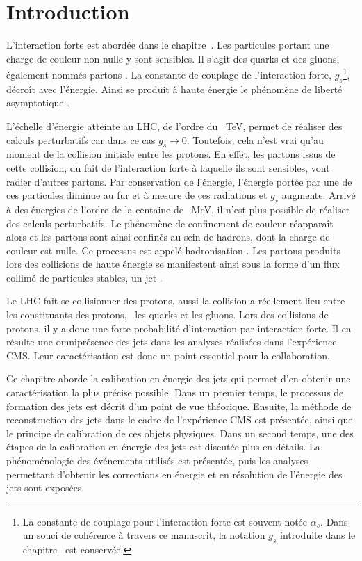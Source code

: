 \section{Introduction}\label{chapter-JERC-section-introduction}
L'interaction forte est abordée dans le chapitre~.
Les particules portant une charge de couleur non nulle y sont sensibles.
Il s'agit des quarks et des gluons, également nommés \og partons \fg.
La constante de couplage de l'interaction forte, $g_s$\footnote{La constante de couplage pour l'interaction forte est souvent notée $\alpha_s$. Dans un souci de cohérence à travers ce manuscrit, la notation $g_s$ introduite dans le chapitre~ est conservée.}, décroît  avec l'énergie.
Ainsi se produit à haute énergie le phénomène de \og liberté asymptotique \fg.
\par L'échelle d'énergie atteinte au LHC, de l'ordre du \SI{}{\TeV}, permet de réaliser des calculs perturbatifs car dans ce cas $g_s \to 0$. Toutefois, cela n'est vrai qu'au moment de la collision initiale entre les protons.
En effet, les partons issus de cette collision, du fait de l'interaction forte à laquelle ils sont sensibles, vont radier d'autres partons.
Par conservation de l'énergie, l'énergie portée par une de ces particules diminue au fur et à mesure de ces radiations et $g_s$ augmente.
Arrivé à des énergies de l'ordre de la centaine de \SI{}{\MeV}, il n'est plus possible de réaliser des calculs perturbatifs.
Le phénomène de confinement de couleur réapparaît alors et les partons sont ainsi confinés au sein de hadrons, dont la charge de couleur est nulle.
Ce processus est appelé \og hadronisation \fg.
Les partons produits lors des collisions de haute énergie se manifestent ainsi sous la forme d'un flux collimé de particules stables, un \og jet \fg.
\par Le LHC fait se collisionner des protons, aussi la collision a réellement lieu entre les constituants des protons, \ie\ les quarks et les gluons. Lors des collisions de protons, il y a donc une forte probabilité d'interaction par interaction forte. Il en résulte une omniprésence des jets dans les analyses réalisées dans l'expérience CMS. Leur caractérisation est donc un point essentiel pour la collaboration.
\par Ce chapitre aborde la calibration en énergie des jets qui permet d'en obtenir une caractérisation la plus précise possible.
Dans un premier temps, le processus de formation des jets est décrit d'un point de vue théorique. Ensuite, la méthode de reconstruction des jets dans le cadre de l'expérience CMS est présentée, ainsi que le principe de calibration de ces objets physiques.
Dans un second temps, une des étapes de la calibration en énergie des jets est discutée plus en détails. La phénoménologie des événements utilisés est présentée, puis les analyses permettant d'obtenir les corrections en énergie et en résolution de l'énergie des jets sont exposées.